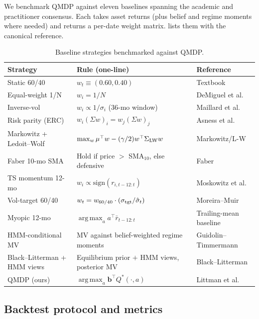 \documentclass[11pt]{article}
\theoremstyle{plain1}
\theoremstyle{definition1}
\newcommand{\argmax}{\operatorname*{arg\,max}}
\newcommand{\1}{\mathbf{1}}
\newcommand{\bel}{\mathbf{b}}
\begin{document}
We benchmark QMDP against eleven baselines spanning the academic and practitioner consensus. Each takes asset returns (plus belief and regime moments where needed) and returns a per-date weight matrix.  lists them with the canonical reference.

\begin{table}[H]\centering\small\renewcommand{\arraystretch}{1.0}
\caption{Baseline strategies benchmarked against QMDP.}\label{tab:baselines}
\setlength{\tabcolsep}{4pt}
\begin{tabular}{p{3.6cm} p{8.1cm} l}
\toprule
\textbf{Strategy} & \textbf{Rule (one-line)} & \textbf{Reference} \\
\midrule
Static 60/40 & $w_t\equiv(0.60,0.40)$ & Textbook \\
Equal-weight 1/N & $w_i=1/N$ & DeMiguel et al.\ \cite{demiguel2009} \\
Inverse-vol & $w_i\propto 1/\sigma_i$ (36-mo window) & Maillard et al.\ \cite{maillard2010} \\
Risk parity (ERC) & $w_i(\Sigma w)_i = w_j(\Sigma w)_j$ & Asness et al.\ \cite{asness2012} \\
Markowitz + Ledoit--Wolf & $\max_w \mu^\top w - (\gamma/2)w^\top\Sigma_{\rm LW}w$ & Markowitz/L-W \cite{markowitz1952,ledoit2004} \\
Faber 10-mo SMA & Hold if price $>$ SMA$_{10}$, else defensive & Faber \cite{faber2007} \\
TS momentum 12-mo & $w_i\propto\mathrm{sign}(r_{i,t-12:t})$ & Moskowitz et al.\ \cite{moskowitz2012} \\
Vol-target 60/40 & $w_t = w_{60/40}\cdot(\sigma_{\rm tgt}/\hat\sigma_t)$ & Moreira--Muir \cite{moreira2017} \\
Myopic 12-mo & $\argmax_a a^\top\bar r_{t-12:t}$ & Trailing-mean baseline \\
HMM-conditional MV & MV against belief-weighted regime moments & Guidolin--Timmermann \cite{guidolin2007} \\
Black--Litterman + HMM views & Equilibrium prior $+$ HMM views, posterior MV & Black--Litterman \cite{black1992} \\
QMDP (ours) & $\argmax_a \bel^\top Q^\ast(\cdot,a)$ & Littman et al.\ \cite{littman1995} \\
\bottomrule
\end{tabular}
\end{table}

\subsection{Backtest protocol and metrics}\label{sec:protocol}
\end{document}
